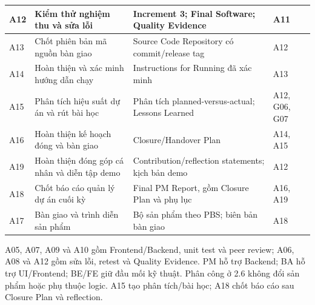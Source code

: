 \documentclass{article}
\begin{document}
\begin{landscape}
\begin{table}[H]
\begin{tabularx}{\linewidth}{|p{1.2cm}|X|p{8cm}|p{4.2cm}|}
A12 & Kiểm thử nghiệm thu và sửa lỗi & Increment 3; Final Software; Quality Evidence & A11 \\ \hline
A13 & Chốt phiên bản mã nguồn bàn giao & Source Code Repository có commit/release tag & A12 \\ \hline
A14 & Hoàn thiện và xác minh hướng dẫn chạy & Instructions for Running đã xác minh & A13 \\ \hline
A15 & Phân tích hiệu suất dự án và rút bài học & Phân tích planned-versus-actual; Lessons Learned & A12, G06, G07 \\ \hline
A16 & Hoàn thiện kế hoạch đóng và bàn giao & Closure/Handover Plan & A14, A15 \\ \hline
A19 & Hoàn thiện đóng góp cá nhân và diễn tập demo & Contribution/reflection statements; kịch bản demo & A12 \\ \hline
A18 & Chốt báo cáo quản lý dự án cuối kỳ & Final PM Report, gồm Closure Plan và phụ lục & A16, A19 \\ \hline
A17 & Bàn giao và trình diễn sản phẩm & Bộ sản phẩm theo PBS; biên bản bàn giao & A18 \\ \hline
\end{tabularx}
\end{table}

\noindent A05, A07, A09 và A10 gồm Frontend/Backend, unit test và peer review; A06, A08 và A12 gồm sửa lỗi, retest và Quality Evidence. PM hỗ trợ Backend; BA hỗ trợ UI/Frontend; BE/FE giữ đầu mối kỹ thuật. Phân công ở 2.6 không đổi sản phẩm hoặc phụ thuộc logic. A15 tạo phân tích/bài học; A18 chốt báo cáo sau Closure Plan và reflection.
\newpage

\end{landscape}
\end{document}

